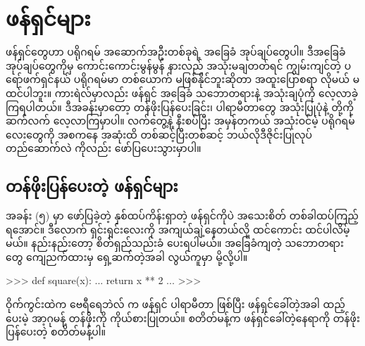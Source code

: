 \chapter{ဖန်ရှင်များ} \label{ch:ch08Funs}
ဖန်ရှင်တွေဟာ ပရိုဂရမ် အဆောက်အဦးတစ်ခုရဲ့ အခြေခံ အုပ်ချပ်တွေပါ။ ဒီအခြေခံ အုပ်ချပ်တွေကိုမှ ကောင်းကောင်းမွန်မွန် နားလည် အသုံးမချတတ်ရင် ကျွမ်းကျင်တဲ့ ပရော်ဖက်ရှင်နယ် ပရိုဂရမ်မာ တစ်ယောက် မဖြစ်နိုင်ဘူးဆိုတာ အထူးပြောစရာ လိုမယ် မထင်ပါဘူး။ ကားရဲလ်မှာလည်း ဖန်ရှင် အခြေခံ သဘောတရားနဲ့ အသုံးချပုံကို လေ့လာခဲ့ကြရပါတယ်။ ဒီအခန်းမှာတော့ တန်ဖိုးပြန်ပေးခြင်း၊ ပါရာမီတာတွေ အသုံးပြုပုံနဲ့  တို့ကို ဆက်လက် လေ့လာကြမှာပါ။ လက်တွေ့နဲ့ နီးစပ်ပြီး အမှန်တကယ် အသုံးဝင်မဲ့ ပရိုဂရမ်လေးတွေကို  အစကနေ အဆုံးထိ တစ်ဆင့်ပြီးတစ်ဆင့် ဘယ်လိုဒီဇိုင်းပြုလုပ် တည်ဆောက်လဲ ကိုလည်း ဖော်ပြပေးသွားမှာပါ။

\section{တန်ဖိုးပြန်ပေးတဲ့ ဖန်ရှင်များ}
အခန်း (၅) မှာ ဖော်ပြခဲ့တဲ့ နှစ်ထပ်ကိန်းရှာတဲ့  ဖန်ရှင်ကိုပဲ အသေးစိတ် တစ်ခါထပ်ကြည့်ရအောင်။ ဒီလောက် ရှင်းရှင်းလေးကို အကျယ်ချဲ့နေတယ်လို့ ထင်ကောင်း ထင်ပါလိမ့်မယ်။ နည်းနည်းတော့  စိတ်ရှည်သည်းခံ ပေးရပါမယ်။ အခြေခံကျတဲ့ သဘောတရားတွေ ကျေညက်ထားမှ ရှေ့ဆက်တဲ့အခါ လွယ်\allowbreak ကူမှာ မို့လို့ပါ။  %
%
\begin{codetxt}
>>> def square(x):
...     return x ** 2
...
>>> 
\end{codetxt}
%
ဝိုက်ကွင်းထဲက ဗေရီရေဘဲလ်   က ဖန်ရှင် ပါရာမီတာ  ဖြစ်ပြီး ဖန်ရှင်ခေါ်တဲ့အခါ ထည့်ပေးမဲ့ အာ့ဂုမန့်   တန်ဖိုးကို ကိုယ်စားပြုတယ်။  စတိတ်မန့်က ဖန်ရှင်ခေါ်တဲ့နေရာကို တန်ဖိုးပြန်ပေးတဲ့ စတိတ်မန့်ပါ။ 

